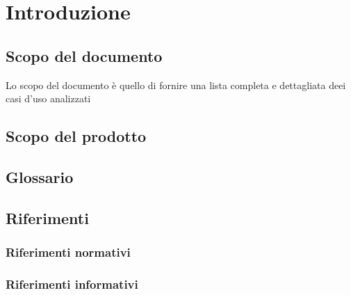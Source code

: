 \section{Introduzione}
\subsection{Scopo del documento}
Lo scopo del documento è quello di fornire una lista completa e dettagliata deei casi d'uso analizzati 
\subsection{Scopo del prodotto}
\subsection{Glossario}
\subsection{Riferimenti}
\subsubsection{Riferimenti normativi}
\subsubsection{Riferimenti informativi}